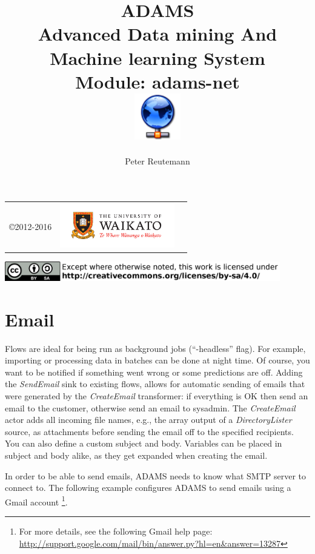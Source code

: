 \documentclass[a4paper]{book}
\title{
  \textbf{ADAMS} \\
  {\Large \textbf{A}dvanced \textbf{D}ata mining \textbf{A}nd \textbf{M}achine
  learning \textbf{S}ystem} \\
  {\Large Module: adams-net} \\
  \vspace{1cm}
  \includegraphics[width=2cm]{images/net-module.png} \\
}
\author{
  Peter Reutemann
}
\begin{document}
\begin{titlepage}
\maketitle

\thispagestyle{empty}
\center
\begin{table}[b]
	\begin{tabular}{c l l}
		\parbox[c][2cm]{2cm}{\copyright 2012-2016} &
		\parbox[c][2cm]{5cm}{\includegraphics[width=5cm]{images/coat_of_arms.pdf}} \\
	\end{tabular}
	\includegraphics[width=12cm]{images/cc.png} \\
\end{table}

\end{titlepage}

\tableofcontents
\listoffigures


\chapter{Email}
Flows are ideal for being run as background jobs (``-headless'' flag). For
example, importing or processing data in batches can be done at night time. 
Of course, you want to be notified if something went wrong or some predictions
are off. Adding the \textit{SendEmail} sink to existing flows, allows for automatic
sending of emails that were generated by the \textit{CreateEmail} transformer: 
if everything is OK then send an email to the customer,
otherwise send an email to sysadmin. The \textit{CreateEmail} actor adds all incoming
file names, e.g., the array output of a \textit{DirectoryLister} source, as
attachments before sending the email off to the specified recipients. You can
also define a custom subject and body. Variables can be placed in subject and
body alike, as they get expanded when creating the email.

In order to be able to send emails, ADAMS needs to know what SMTP server to
connect to. The following example configures ADAMS to send emails using a Gmail
account \footnote{For more details, see the following Gmail help page: \\
\url{http://support.google.com/mail/bin/answer.py?hl=en&answer=13287}{}}. 
\end{document}
